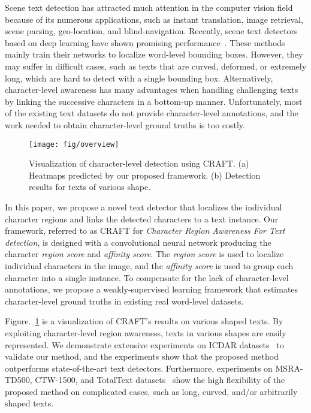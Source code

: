 \documentclass[10pt,twocolumn,letterpaper]{article}
\newcommand\jh[1]{\textcolor{purple}{#1}}
\begin{document}
Scene text detection has attracted much attention in the computer vision field because of its numerous applications, such as instant translation, image retrieval, scene parsing, geo-location, and blind-navigation. Recently, scene text detectors based on deep learning have shown promising performance~\cite{he2017single,zhou2017east,liu2018fots,deng2018pixellink,he2017deep,he2018end,hu2017wordsup,jiang2017r2cnn,liao2018textboxes++,long2018textsnake,lyu2018mask,shi2017detecting,lyu2018multi}.
These methods mainly train their networks to localize word-level bounding boxes. However, they may suffer in difficult cases, such as texts that are curved, deformed, or extremely long, which are hard to detect with a single bounding box. Alternatively, character-level awareness has many advantages when handling challenging texts by linking the successive characters in a bottom-up manner. Unfortunately, most of the existing text datasets do not provide character-level annotations, and the work needed to obtain character-level ground truths is too costly. 

\begin{figure}[t]
  \centering
\texttt{[image: fig/overview]}
  \caption{Visualization of character-level detection using CRAFT. (a) Heatmaps predicted by our proposed framework. (b) Detection results for texts of various shape.}
  \label{fig:overview} 
  \vspace{-3mm}
\end{figure}

In this paper, we propose a novel text detector that localizes the individual character regions and links the detected characters to a text instance. Our framework, referred to as CRAFT for \textit{Character Region Awareness For Text detection}, is designed with a convolutional neural network producing the character \textit{region score} and \textit{affinity score}. The \textit{region score} is used to localize individual characters in the image, and the \textit{affinity score} is used to group each character into a single instance. To compensate for the lack of character-level annotations, we propose a weakly-supervised learning framework that estimates character-level ground truths in existing real word-level datasets.

Figure.~\ref{fig:overview} is a visualization of CRAFT's results on various shaped texts. By exploiting character-level region awareness, texts in various shapes are easily represented. We demonstrate extensive experiments on ICDAR datasets~\cite{karatzas2013icdar,karatzas2015icdar,nayef2017icdar2017} to validate our method, and the experiments show that the proposed method outperforms state-of-the-art text detectors. Furthermore, experiments on MSRA-TD500, CTW-1500, and TotalText datasets~\cite{yao2012detecting,yuliang2017detecting,ch2017total} show the high flexibility of the proposed method on complicated cases\jh{,} such as long, curved, and/or arbitrarily shaped texts.
\end{document}
